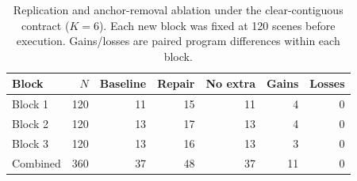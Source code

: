\begin{table}[H]\centering\small
\caption{Replication and anchor-removal ablation under the clear-contiguous contract ($K=6$). Each new block was fixed at 120 scenes before execution. Gains/losses are paired program differences within each block.}
\label{tab:v3-blocks}
\begin{tabular}{lrrrrrr}\toprule
Block & $N$ & Baseline & Repair & No extra & Gains & Losses \\\midrule
Block 1 & 120 & 11 & 15 & 11 & 4 & 0 \\
Block 2 & 120 & 13 & 17 & 13 & 4 & 0 \\
Block 3 & 120 & 13 & 16 & 13 & 3 & 0 \\
Combined & 360 & 37 & 48 & 37 & 11 & 0 \\
\bottomrule\end{tabular}\end{table}
